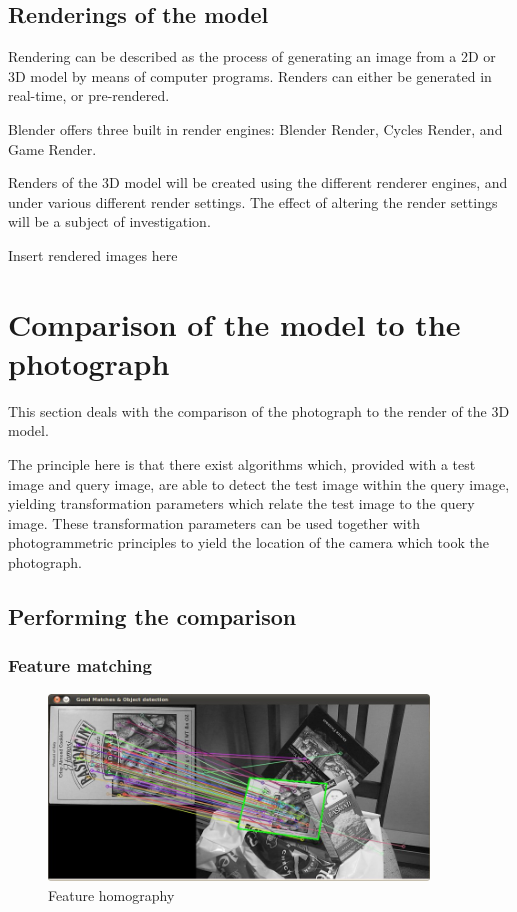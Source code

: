 \documentclass[11pt,a4paper]{report}
\begin{document}
			
		\subsection{Renderings of the model}
			Rendering can be described as the process of generating an image from a 2D or 3D model by means of computer programs. Renders can either be generated in real-time, or pre-rendered.
			
			Blender offers three built in render engines: Blender Render, Cycles Render, and Game Render.
			
			Renders of the 3D model will be created using the different renderer engines, and under various different render settings. The effect of altering the render settings will be a subject of investigation.
			
			{{Insert rendered images here}}
			
	\section{Comparison of the model to the photograph}
		This section deals with the comparison of the photograph to the render of the 3D model.
		
		The principle here is that there exist algorithms which, provided with a test image and query image, are able to detect the test image within the query image, yielding transformation parameters which relate the test image to the query image. These transformation parameters can be used together with photogrammetric principles to yield the location of the camera which took the photograph.
		
		\subsection{Performing the comparison}
			\subsubsection{Feature matching}
				\begin{figure}[H]
					\centering
					\includegraphics[width=0.9\textwidth]{feature_homography_example}
					\caption{Feature homography}
					\label{fig:feature_homogrophy}
				\end{figure}
				
\end{document}
